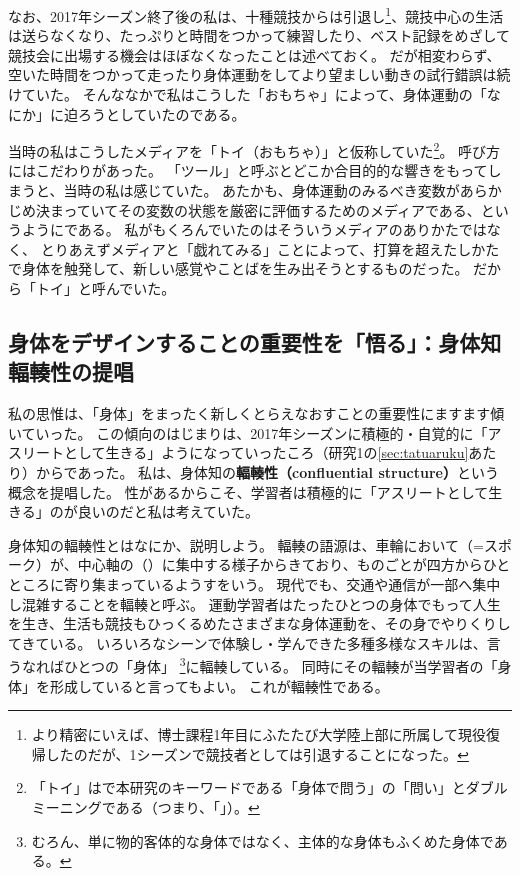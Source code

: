 なお、2017年シーズン終了後の私は、十種競技からは引退し\footnote{
  より精密にいえば、博士課程1年目にふたたび大学陸上部に所属して現役復帰したのだが、1シーズンで競技者としては引退することになった。
}、競技中心の生活は送らなくなり、たっぷりと時間をつかって練習したり、ベスト記録をめざして競技会に出場する機会はほぼなくなったことは述べておく。
だが相変わらず、空いた時間をつかって走ったり身体運動をしてより望ましい動きの試行錯誤は続けていた。
そんななかで私はこうした「おもちゃ」によって、身体運動の「なにか」に迫ろうとしていたのである。

当時の私はこうしたメディアを「トイ（おもちゃ）」と仮称していた\footnote{
  「トイ」はで本研究のキーワードである「身体で問う」の「問い」とダブルミーニングである（つまり、「」）。
}\cite{horiuchi_suwa:2018b}。
呼び方にはこだわりがあった。
「ツール」と呼ぶとどこか合目的的な響きをもってしまうと、当時の私は感じていた。
あたかも、身体運動のみるべき変数があらかじめ決まっていてその変数の状態を厳密に評価するためのメディアである、というようにである。
私がもくろんでいたのはそういうメディアのありかたではなく、
とりあえずメディアと「戯れてみる」ことによって、打算を超えたしかたで身体を触発して、新しい感覚やことばを生み出そうとするものだった。
だから「トイ」と呼んでいた。

\subsection{身体をデザインすることの重要性を「悟る」：身体知輻輳性の提唱}
\label{subsec:fukusousei}
私の思惟は、「身体」をまったく新しくとらえなおすことの重要性にますます傾いていった。
この傾向のはじまりは、2017年シーズンに積極的・自覚的に「アスリートとして生きる」ようになっていったころ（研究1の\ref{sec:tatuaruku}あたり）からであった。
私は、身体知の\textbf{輻輳性（confluential structure）}という概念を提唱した\cite{horiuchi_suwa:2019b}。
性があるからこそ、学習者は積極的に「アスリートとして生きる」のが良いのだと私は考えていた。

身体知の輻輳性とはなにか、説明しよう。
輻輳の語源は、車輪において（=スポーク）が、中心軸の（）に集中する様子からきており、ものごとが四方からひとところに寄り集まっているようすをいう。
現代でも、交通や通信が一部へ集中し混雑することを輻輳と呼ぶ。
運動学習者はたったひとつの身体でもって人生を生き、生活も競技もひっくるめたさまざまな身体運動を、その身でやりくりしてきている。
いろいろなシーンで体験し・学んできた多種多様なスキルは、言うなればひとつの「身体」
\footnote{むろん、単に物的客体的な身体ではなく、主体的な身体もふくめた身体である。}に輻輳している。
同時にその輻輳が当学習者の「身体」を形成していると言ってもよい。
これが輻輳性である。

